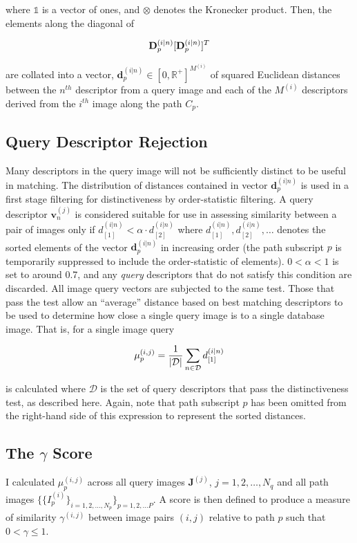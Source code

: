 where $\mathds{1}$ is a vector of ones, and $\otimes$ denotes the Kronecker product.
Then, the elements along the diagonal of

\begin{equation}
\centering
 \mathbf{D}^{(i|n)}_p[\mathbf{D}^{(i|n)}_p]^T
\end{equation}

are collated into a vector, $\mathbf{d}^{(i|n)}_p \in [0,\mathbb{R}^+]^{M^{(i)}}$ of squared Euclidean distances between the $n^{th}$ descriptor from a query image and each of the $M^{(i)}$ descriptors derived from the $i^{th}$ image along the path $C_p$. 

\subsection{Query Descriptor Rejection} \label{subsec:querydescrejection}
Many descriptors in the query image will not be sufficiently distinct to be useful in matching.  The distribution of distances contained in vector $\mathbf{d}^{(i|n)}_p$ is used in a first stage filtering for distinctiveness by order-statistic filtering.  A query descriptor $\mathbf{v}_n^{(j)}$ is considered suitable for use in assessing similarity between a pair of images only if $d^{(i|n)}_{[1]} < \alpha \cdot d^{(i|n)}_{[2]}$ where $d^{(i|n)}_{[1]}, d^{(i|n)}_{[2]},\ldots $ denotes the sorted elements of the vector $\mathbf{d}^{(i|n)}_p$ in increasing order (the path subscript $p$ is temporarily suppressed to include the order-statistic of elements).  $0<\alpha<1$ is set to around 0.7, and any \textit{query} descriptors that do not satisfy this condition are discarded. All image query vectors are subjected to the same test.  Those that pass the test allow an ``average'' distance based on best matching descriptors to be used to determine how close a single query image is to a single database image. That is, for a single image query 

\begin{equation}
\centering
\mu^{(i,j)}_p=\frac{1}{|\mathcal{D}|}\sum_{n\in \mathcal{D}} d^{(i|n)}_{[1]}
\end{equation}

is calculated where $\mathcal{D}$ is the set of query descriptors that pass the distinctiveness test, as described here. Again, note that path subscript $p$ has been omitted from the right-hand side of this expression to represent the sorted distances.

\subsection{The $\gamma$ Score} I calculated  $\mu_p^{(i,j)}$ across all query images $\mathbf{J}^{(j)}$, $j=1,2,\ldots,N_q$ and all path images $\lbrace\lbrace I^{(i)}_p\rbrace_{i=1,2,\ldots,N_p}\rbrace_{p=1,2,\ldots P}$.   A score is then defined to produce a measure of similarity $\gamma^{(i,j)}$ between image pairs $(i,j)$ relative to path $p$ such that $0 < \gamma \le 1$. 


